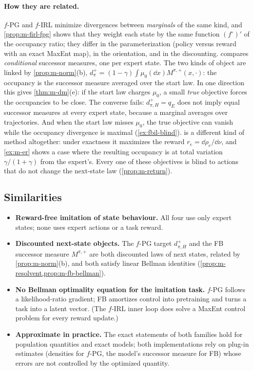 \paragraph{How they are related.}
$f$-PG and $f$-IRL minimize divergences between \emph{marginals} of the same kind, and \cref{prop:m-firl-fpg} shows that they weight each state by the same function $(f^\circ)'$ of the occupancy ratio; they differ in the parameterization (policy versus reward with an exact MaxEnt map), in the orientation, and in the discounting.
\DMFB{} compares \emph{conditional} successor measures, one per expert state. The two kinds of object are linked by \cref{prop:m-norm}(b), $d^+_\pi=(1-\gamma)\int\mu_0(\dd x)M^{\pi,+}(x,\cdot)$: the occupancy is the successor measure averaged over the start law.
In one direction this gives \cref{thm:m-dm}(e): if the start law charges $\mu_0$, a small \emph{true} \DMFB{} objective forces the occupancies to be close.
The converse fails: $d^+_{\pi,H}=q_E$ does not imply equal successor measures at every expert state, because a marginal averages over trajectories.
And when the start law misses $\mu_0$, the true \DMFB{} objective can vanish while the occupancy divergence is maximal (\cref{ex:fbil-blind}).
\ERFB{} is a different kind of method altogether: under exactness it maximizes the reward $r_e=\dd\rho_e/\dd\nu$, and \cref{ex:m-er} shows a case where the resulting occupancy is at total variation $\gamma/(1+\gamma)$ from the expert's.
Every one of these objectives is blind to actions that do not change the next-state law (\cref{prop:m-return}).

\subsection{Similarities}

\begin{itemize}[nosep]
\item \textbf{Reward-free imitation of state behaviour.} All four use only expert states; none uses expert actions or a task reward.
\item \textbf{Discounted next-state objects.} The $f$-PG target $d^+_{\pi,H}$ and the FB successor measure $M^{\pi,+}$ are both discounted laws of next states, related by \cref{prop:m-norm}(b), and both satisfy linear Bellman identities (\cref{prop:m-resolvent,prop:m-fb-bellman}).
\item \textbf{No Bellman optimality equation for the imitation task.} $f$-PG follows a likelihood-ratio gradient; FB amortizes control into pretraining and turns a task into a latent vector. (The $f$-IRL inner loop does solve a MaxEnt control problem for every reward update.)
\item \textbf{Approximate in practice.} The exact statements of both families hold for population quantities and exact models; both implementations rely on plug-in estimates (densities for $f$-PG, the model's successor measure for FB) whose errors are not controlled by the optimized quantity.
\end{itemize}

